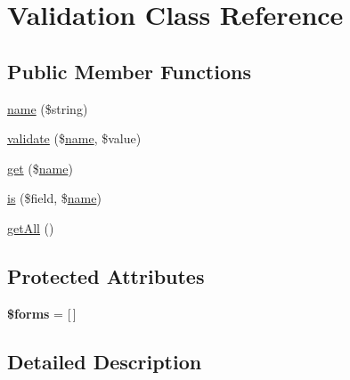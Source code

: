 \hypertarget{classcommon_1_1user_1_1legacy_1_1_validation}{\section{\-Validation \-Class \-Reference}
\label{classcommon_1_1user_1_1legacy_1_1_validation}
}
\subsection*{\-Public \-Member \-Functions}
\begin{DoxyCompactItemize}
\item 
\hyperlink{classcommon_1_1user_1_1legacy_1_1_validation_a3c49872dc41e063d02a5336a54780f15}{name} (\$string)
\item 
\hyperlink{classcommon_1_1user_1_1legacy_1_1_validation_a1ba8ea5a7fb74d491411290ec8c76402}{validate} (\$\hyperlink{classcommon_1_1user_1_1legacy_1_1_validation_a3c49872dc41e063d02a5336a54780f15}{name}, \$value)
\item 
\hyperlink{classcommon_1_1user_1_1legacy_1_1_validation_af5ea6a083ddb07beb8a30dd32e309ceb}{get} (\$\hyperlink{classcommon_1_1user_1_1legacy_1_1_validation_a3c49872dc41e063d02a5336a54780f15}{name})
\item 
\hyperlink{classcommon_1_1user_1_1legacy_1_1_validation_af51af2c766e3db5ae103d28479add0db}{is} (\$field, \$\hyperlink{classcommon_1_1user_1_1legacy_1_1_validation_a3c49872dc41e063d02a5336a54780f15}{name})
\item 
\hyperlink{classcommon_1_1user_1_1legacy_1_1_validation_aba0d5b303383fb5b1fabb5fd01cd3800}{get\-All} ()
\end{DoxyCompactItemize}
\subsection*{\-Protected \-Attributes}
\begin{DoxyCompactItemize}
\item 
\hypertarget{classcommon_1_1user_1_1legacy_1_1_validation_a8dcd469e6c336555e43c3003b0a0da54}{{\bfseries \$forms} = \mbox{[}$\,$\mbox{]}}\label{classcommon_1_1user_1_1legacy_1_1_validation_a8dcd469e6c336555e43c3003b0a0da54}

\end{DoxyCompactItemize}


\subsection{\-Detailed \-Description}


